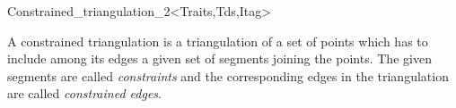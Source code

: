 

\begin{ccRefClass}{Constrained_triangulation_2<Traits,Tds,Itag>}  %


\ccDefinition  
A constrained triangulation is a triangulation of a set of points
which has to include among its edges 
a given set of segments
joining the points. The given segments are
called {\em constraints}  and the corresponding 
edges in the triangulation are called {\em constrained edges}. 


\end{ccRefClass}
